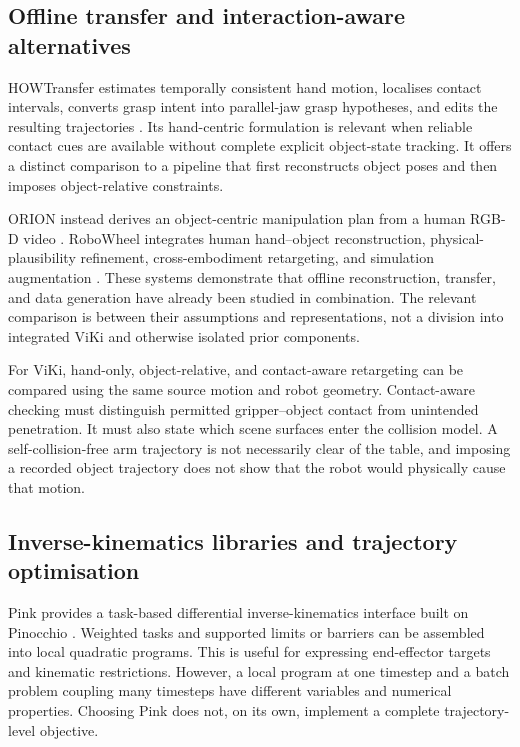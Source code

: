 \subsection{Offline transfer and interaction-aware alternatives}

HOWTransfer estimates temporally consistent hand motion, localises contact
intervals, converts grasp intent into parallel-jaw grasp hypotheses, and edits
the resulting trajectories \cite{howtransfer}. Its hand-centric formulation
is relevant when reliable contact cues are available without complete explicit
object-state tracking. It offers a distinct comparison to a pipeline that
first reconstructs object poses and then imposes object-relative constraints.

ORION instead derives an object-centric manipulation plan from a human RGB-D
video \cite{orion}. RoboWheel integrates human hand--object reconstruction,
physical-plausibility refinement, cross-embodiment retargeting, and simulation
augmentation \cite{robowheel}. These systems demonstrate that offline
reconstruction, transfer, and data generation have already been studied in
combination. The relevant comparison is between their assumptions and
representations, not a division into integrated ViKi and otherwise isolated
prior components.

For ViKi, hand-only, object-relative, and contact-aware retargeting can be
compared using the same source motion and robot geometry. Contact-aware
checking must distinguish permitted gripper--object contact from unintended
penetration. It must also state which scene surfaces enter the collision
model. A self-collision-free arm trajectory is not necessarily clear of the
table, and imposing a recorded object trajectory does not show that the robot
would physically cause that motion.

\subsection{Inverse-kinematics libraries and trajectory optimisation}

Pink provides a task-based differential inverse-kinematics interface built on
Pinocchio \cite{pink}. Weighted tasks and supported limits or barriers can be
assembled into local quadratic programs. This is useful for expressing
end-effector targets and kinematic restrictions. However, a local program at
one timestep and a batch problem coupling many timesteps have different
variables and numerical properties. Choosing Pink does not, on its own,
implement a complete trajectory-level objective.

